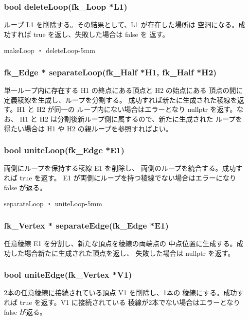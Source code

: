 \subsubsection*{\hspace*{0.6cm}bool deleteLoop(fk\_Loop *L1)}
	ループ L1 を削除する。その結果として、L1 が存在した場所は
	空洞になる。成功すれば true を返し、失敗した場合は false を
	返す。

	{makeLoop ・ deleteLoop}{-5mm}

 \subsubsection*{\hspace*{0.6cm}fk\_Edge *
	separateLoop(fk\_Half *H1, fk\_Half *H2)}
	単一ループ内に存在する H1 の終点にある頂点と H2 の始点にある
	頂点の間に定義稜線を生成し、ループを分割する。
	成功すれば新たに生成された稜線を返す。H1 と H2 が同一の
	ループ内にない場合はエラーとなり nullptr を返す。なお、
	H1 と H2 は分割後新ループ側に属するので、新たに生成された
	ループを得たい場合は H1 や H2 の親ループを参照すればよい。

 \subsubsection*{\hspace*{0.6cm}bool uniteLoop(fk\_Edge *E1)}
	両側にループを保持する稜線 E1 を削除し、
	両側のループを統合する。成功すれば true を返す。
	E1 が両側にループを持つ稜線でない場合はエラーになり false が返る。

	{separateLoop ・ uniteLoop}{-5mm}

 \subsubsection*{\hspace*{0.6cm}fk\_Vertex * separateEdge(fk\_Edge *E1)}
	任意稜線 E1 を分割し、新たな頂点を稜線の両端点の
	中点位置に生成する。成功した場合新たに生成された頂点を返し、
	失敗した場合は nullptr を返す。

 \subsubsection*{\hspace*{0.6cm}bool uniteEdge(fk\_Vertex *V1)}
	2本の任意稜線に接続されている頂点 V1 を削除し、1本の
	稜線にする。成功すれば true を返す。V1 に接続されている
	稜線が2本でない場合はエラーとなり false が返る。

